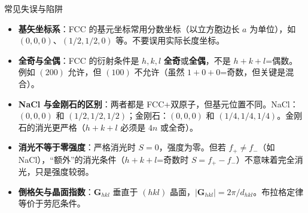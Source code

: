 \begin{errorbox}{常见失误与陷阱}
\begin{itemize}
    \item \textbf{基矢坐标系}：FCC 的基元坐标常用分数坐标（以立方胞边长 $a$ 为单位），如 $(0,0,0)$、$(1/2,1/2,0)$ 等。不要误用实际长度坐标。
    \item \textbf{全奇与全偶}：FCC 的衍射条件是 $h,k,l$ \textbf{全奇}或\textbf{全偶}，不是 $h+k+l$=偶数。例如 $(200)$ 允许，但 $(100)$ 不允许（虽然 $1+0+0$=奇数，但关键是混合）。
    \item \textbf{NaCl 与金刚石的区别}：两者都是 FCC+双原子，但基元位置不同。NaCl：$(0,0,0)$ 和 $(1/2,1/2,1/2)$；金刚石：$(0,0,0)$ 和 $(1/4,1/4,1/4)$。金刚石的消光更严格（$h+k+l$ 必须是 $4n$ 或全奇）。
    \item \textbf{消光不等于零强度}：严格消光时 $S=0$，强度为零。但若 $f_+\neq f_-$（如 NaCl），``额外''的消光条件（$h+k+l$=奇数时 $S=f_+-f_-$）不意味着完全消光，只是强度较弱。
    \item \textbf{倒格矢与晶面指数}：$\mathbf{G}_{hkl}$ 垂直于 $(hkl)$ 晶面，$|\mathbf{G}_{hkl}|=2\pi/d_{hkl}$。布拉格定律等价于劳厄条件。
\end{itemize}
\end{errorbox}

